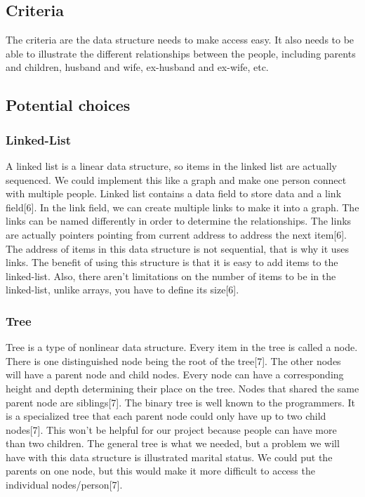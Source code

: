 \documentclass[onecolumn, draftclsnofoot, 10pt, compsoc]{IEEEtran}
\begin{document}
\subsection{Criteria}
\begin{singlespace}
The criteria are the data structure needs to make access easy. It also needs to be able to illustrate the different relationships between the people, including parents and children, husband and wife, ex-husband and ex-wife, etc. 
\end{singlespace}

\subsection{Potential choices}

\subsubsection{Linked-List}
\begin{singlespace}
A linked list is a linear data structure, so items in the linked list are actually sequenced. We could implement this like a graph and make one person connect with multiple people. Linked list contains a data field to store data and a link field[6]. In the link field, we can create multiple links to make it into a graph. The links can be named differently in order to determine the relationships. The links are actually pointers pointing from current address to address the next item[6]. The address of items in this data structure is not sequential, that is why it uses links. The benefit of using this structure is that it is easy to add items to the linked-list. Also, there aren't limitations on the number of items to be in the linked-list, unlike arrays, you have to define its size[6].
\end{singlespace}

\subsubsection{Tree}
\begin{singlespace}
Tree is a type of nonlinear data structure. Every item in the tree is called a node. There is one distinguished node being the root of the tree[7]. The other nodes will have a parent node and child nodes. Every node can have a corresponding height and depth determining their place on the tree. Nodes that shared the same parent node are siblings[7]. The binary tree is well known to the programmers. It is a specialized tree that each parent node could only have up to two child nodes[7]. This won't be helpful for our project because people can have more than two children. The general tree is what we needed, but a problem we will have with this data structure is illustrated marital status. We could put the parents on one node, but this would make it more difficult to access the individual nodes/person[7].
\end{singlespace}
 
\end{document}
